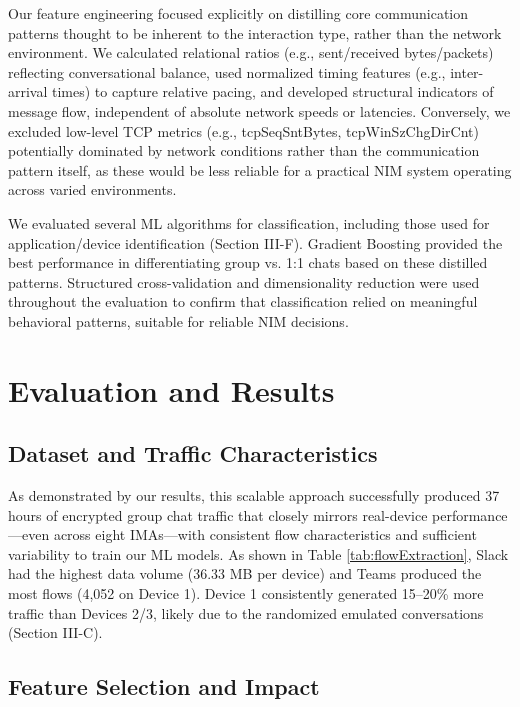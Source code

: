 \documentclass[conference]{IEEEtran}
\begin{document}
Our feature engineering focused explicitly on distilling core communication patterns thought to be inherent to the interaction type, rather than the network environment. We calculated relational ratios (e.g., sent/received bytes/packets) reflecting conversational balance, used normalized timing features (e.g., inter-arrival times) to capture relative pacing, and developed structural indicators of message flow, independent of absolute network speeds or latencies. Conversely, we excluded low-level TCP metrics (e.g., tcpSeqSntBytes, tcpWinSzChgDirCnt) potentially dominated by network conditions rather than the communication pattern itself, as these would be less reliable for a practical NIM system operating across varied environments.

We evaluated several ML algorithms for classification, including those used for application/device identification (Section III-F). Gradient Boosting provided the best performance in differentiating group vs. 1:1 chats based on these distilled patterns. Structured cross-validation and dimensionality reduction were used throughout the evaluation to confirm that classification relied on meaningful behavioral patterns, suitable for reliable NIM decisions.

\section{Evaluation and Results}

\subsection{Dataset and Traffic Characteristics}

As demonstrated by our results, this scalable approach successfully produced 37 hours of encrypted group chat traffic that closely mirrors real-device performance—even across eight IMAs—with consistent flow characteristics and sufficient variability to train our ML models. As shown in Table \ref{tab:flowExtraction}, Slack had the highest data volume (36.33 MB per device) and Teams produced the most flows (4,052 on Device 1). Device 1 consistently generated 15–20\% more traffic than Devices 2/3, likely due to the randomized emulated conversations (Section III-C).


\subsection{Feature Selection and Impact}
\end{document}

